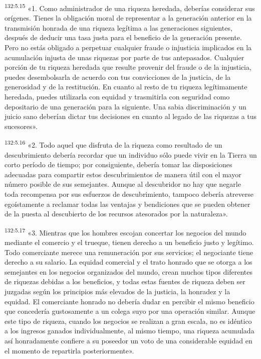 \par
\textsuperscript{132:5.15} «1. Como administrador de una riqueza heredada, deberías considerar sus orígenes. Tienes la obligación moral de representar a la generación anterior en la transmisión honrada de una riqueza legítima a las generaciones siguientes, después de deducir una tasa justa para el beneficio de la generación presente. Pero no estás obligado a perpetuar cualquier fraude o injusticia implicados en la acumulación injusta de unas riquezas por parte de tus antepasados. Cualquier porción de tu riqueza heredada que resulte provenir del fraude o de la injusticia, puedes desembolsarla de acuerdo con tus convicciones de la justicia, de la generosidad y de la restitución. En cuanto al resto de tu riqueza legítimamente heredada, puedes utilizarla con equidad y trasmitirla con seguridad como depositario de una generación para la siguiente. Una sabia discriminación y un juicio sano deberían dictar tus decisiones en cuanto al legado de las riquezas a tus sucesores».

\par
\textsuperscript{132:5.16} «2. Todo aquel que disfruta de la riqueza como resultado de un descubrimiento debería recordar que un individuo sólo puede vivir en la Tierra un corto período de tiempo; por consiguiente, debería tomar las disposiciones adecuadas para compartir estos descubrimientos de manera útil con el mayor número posible de sus semejantes. Aunque al descubridor no hay que negarle toda recompensa por sus esfuerzos de descubrimiento, tampoco debería atreverse egoístamente a reclamar todas las ventajas y bendiciones que se pueden obtener de la puesta al descubierto de los recursos atesorados por la naturaleza».

\par
\textsuperscript{132:5.17} «3. Mientras que los hombres escojan concertar los negocios del mundo mediante el comercio y el trueque, tienen derecho a un beneficio justo y legítimo. Todo comerciante merece una remuneración por sus servicios; el negociante tiene derecho a su salario. La equidad comercial y el trato honrado que se otorga a los semejantes en los negocios organizados del mundo, crean muchos tipos diferentes de riquezas debidas a los beneficios, y todas estas fuentes de riqueza deben ser juzgadas según los principios más elevados de la justicia, la honradez y la equidad. El comerciante honrado no debería dudar en percibir el mismo beneficio que concedería gustosamente a un colega suyo por una operación similar. Aunque este tipo de riqueza, cuando los negocios se realizan a gran escala, no es idéntico a los ingresos ganados individualmente, al mismo tiempo, una riqueza acumulada así honradamente confiere a su poseedor un voto de una considerable equidad en el momento de repartirla posteriormente».

